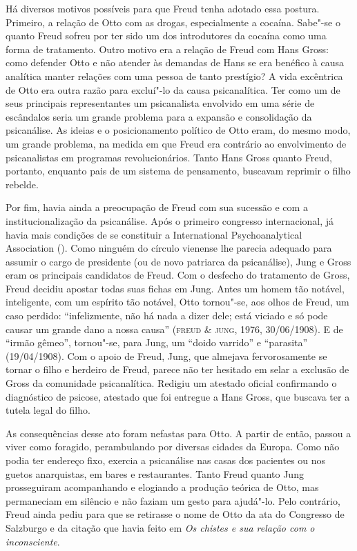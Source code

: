Há diversos motivos possíveis para que Freud tenha adotado essa postura.
Primeiro, a relação de Otto com as drogas, especialmente a cocaína.
Sabe"-se o quanto Freud sofreu por ter sido um dos introdutores da
cocaína como uma forma de tratamento. Outro motivo era a relação de
Freud com Hans Gross: como defender Otto e não atender às demandas de
Hans se era benéfico à causa analítica manter relações com uma pessoa de
tanto prestígio? A vida excêntrica de Otto era outra razão para
excluí"-lo da causa psicanalítica. Ter como um de seus principais
representantes um psicanalista envolvido em uma série de escândalos
seria um grande problema para a expansão e consolidação da psicanálise. As
ideias e o posicionamento político de Otto eram, do mesmo modo, um grande
problema, na medida em que Freud era contrário ao envolvimento de
psicanalistas em programas revolucionários. Tanto Hans Gross quanto
Freud, portanto, enquanto pais de um sistema de pensamento, buscavam
reprimir o filho rebelde.

Por fim, havia ainda a preocupação de Freud com sua sucessão e com a
institucionalização da psicanálise. Após o primeiro congresso
internacional, já havia mais condições de se constituir a International
Psychoanalytical Association (). Como ninguém do círculo vienense lhe
parecia adequado para assumir o cargo de presidente (ou de novo
patriarca da psicanálise), Jung e Gross eram os principais candidatos de
Freud. Com o desfecho do tratamento de Gross, Freud decidiu apostar
todas suas fichas em Jung. Antes um homem tão notável, inteligente, com
um espírito tão notável, Otto tornou"-se, aos olhos de Freud, um caso
perdido: ``infelizmente, não há nada a dizer dele; está viciado e só
pode causar um grande dano a nossa causa'' (\textsc{freud} \& \textsc{jung}, 1976,
30/06/1908). E de ``irmão gêmeo'', tornou"-se, para Jung, um ``doido
varrido'' e ``parasita'' (19/04/1908). Com o apoio de
Freud, Jung, que almejava fervorosamente se tornar o filho e herdeiro de
Freud, parece não ter hesitado em selar a exclusão de Gross da
comunidade psicanalítica. Redigiu um atestado oficial confirmando o
diagnóstico de psicose, atestado que foi entregue a Hans Gross, que
buscava ter a tutela legal do filho.

As consequências desse ato foram nefastas para Otto. A partir de então,
passou a viver como foragido, perambulando por diversas cidades da
Europa. Como não podia ter endereço fixo, exercia a psicanálise nas
casas dos pacientes ou nos guetos anarquistas, em bares e restaurantes.
Tanto Freud quanto Jung prosseguiram acompanhando e elogiando a produção
teórica de Otto, mas permaneciam em silêncio e não faziam um gesto para
ajudá"-lo. Pelo contrário, Freud ainda pediu para que se retirasse o nome
de Otto da ata do Congresso de Salzburgo e da citação que havia feito em
\emph{Os chistes e sua relação com o inconsciente}.

